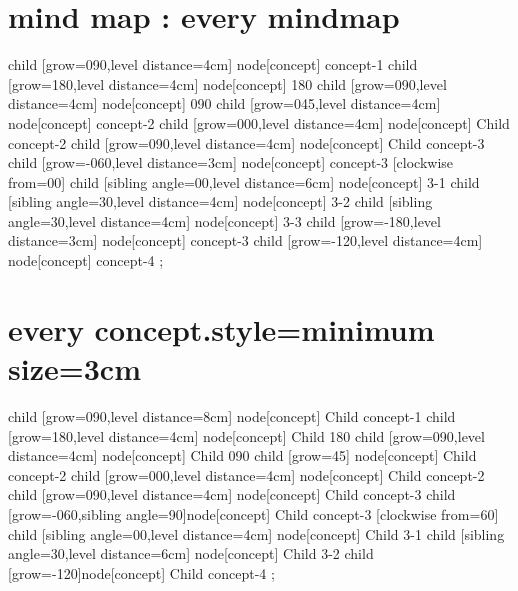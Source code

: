 \documentclass[12pt, a4paper, oneside]{book}
\let\stdsection\section
\renewcommand\section{\newpage\stdsection}
\begin{document}
	\section{mind map : 	every mindmap	}

		\tikz[	every mindmap,
				minimum size=2cm,
				line width=1pt, 
				text width=4em, 
				align=flush center, 
				concept color=black!80,
				concept/.append style={fill={none}} 
				]
					child 		[grow=090,level distance=4cm]	{node[concept] 	{concept-1} 
						child	[grow=180,level distance=4cm]	{node[concept] 	{180} }
						child	[grow=090,level distance=4cm]	{node[concept] 	{090} }
					}
					child 		[grow=045,level distance=4cm]	{node[concept] 	{concept-2} 
						child	[grow=000,level distance=4cm]	{node[concept] 	{Child concept-2} }
						child	[grow=090,level distance=4cm]	{node[concept] 	{Child concept-3} }
					}
					child 		[grow=-060,level distance=3cm]	{node[concept] 	{concept-3} 
							[clockwise from=00]
						child	[sibling angle=00,level distance=6cm]	{node[concept] 	{3-1} }
						child	[sibling angle=30,level distance=4cm]	{node[concept] 	{3-2} }
						child	[sibling angle=30,level distance=4cm]	{node[concept] 	{3-3} }
					}
					child		[grow=-180,level distance=3cm]	{node[concept] 	{concept-3} }
					child 		[grow=-120,level distance=4cm] 	{node[concept] 	{concept-4} };


	\section{every concept\/.style=minimum size=3cm	}

		\tikz[	mindmap,
				line width=1pt, 
				concept color=black!80,
				every concept/.style={minimum size=3cm},				
				concept/.append style={fill={none}} 
				]
					child 		[grow=090,level distance=8cm]	{node[concept] 	{Child concept-1} 
						child	[grow=180,level distance=4cm]	{node[concept] 	{Child 180} }
						child	[grow=090,level distance=4cm]	{node[concept] 	{Child 090} }
					}
					child 		[grow=45]					{node[concept] 	{Child concept-2} 
						child	[grow=000,level distance=4cm]	{node[concept] 	{Child concept-2} }
						child	[grow=090,level distance=4cm]	{node[concept] 	{Child concept-3} }
					}
					child 		[grow=-060,sibling angle=90]{node[concept] 	{Child concept-3} 
								[clockwise from=60]
						child	[sibling angle=00,level distance=4cm]	{node[concept] 	{Child 3-1} }
						child	[sibling angle=30,level distance=6cm]	{node[concept] 	{Child 3-2} }
					}
					child 		[grow=-120]{node[concept] 	{Child concept-4} };
\end{document}
